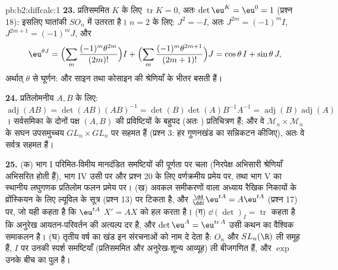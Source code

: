 \begin{solution}{pb:b2:diffcalc:1}
\textbf{23.} प्रतिसममित $K$ के लिए $\operatorname{tr}K = 0$, अतः $\det\eu^K = \eu^0 = 1$ (प्रश्न 18): इसलिए घातांकी
$SO_n$ में उतरता है। $n = 2$ के लिए: $J^2 = -I$, अतः $J^{2m} =
(-1)^mI$, $J^{2m+1} = (-1)^mJ$, और
\[
\eu^{\theta J}
= \Bigl(\sum_m\frac{(-1)^m\theta^{2m}}{(2m)!}\Bigr)I
+ \Bigl(\sum_m\frac{(-1)^m\theta^{2m+1}}{(2m+1)!}\Bigr)J
= \cos\theta\,I + \sin\theta\,J ,
\]
अर्थात् $\theta$ से घूर्णन: और साइन तथा कोसाइन की श्रेणियाँ  के
भीतर बसती हैं।

\textbf{24.} प्रतिलोमनीय $A, B$ के लिए: $\operatorname{adj}(AB) =
\det(AB)(AB)^{-1} = \det(B)\det(A)B^{-1}A^{-1} =
\operatorname{adj}(B)\operatorname{adj}(A)$। सर्वसमिका के दोनों पक्ष $(A, B)$ की
प्रविष्टियों के बहुपद (अतः ) प्रतिचित्रण हैं; और वे $\mathcal M_n\times\mathcal M_n$ के सघन
उपसमुच्चय $GL_n\times GL_n$ पर सहमत हैं (प्रश्न 3: हर गुणनखंड का सन्निकटन कीजिए), अतः
वे सर्वत्र सहमत हैं।

\textbf{25.} (क) भाग I परिमित-विमीय मानदंडित समष्टियों की पूर्णता पर चला
(निरपेक्ष अभिसारी श्रेणियाँ अभिसरित होती हैं), भाग IV उसी पर और प्रश्न 20
के लिए वर्णक्रमीय प्रमेय पर, तथा भाग V का स्थानीय लघुगणक प्रतिलोम फलन
प्रमेय पर। (ख) अवकल समीकरणों वाला अध्याय रैखिक निकायों के व्रोंस्कियन के
लिए ल्यूविल के सूत्र (प्रश्न 13) पर टिकता है, और $\frac{\dd}{\dd t}\eu^{tA} = A\eu^{tA}$ (प्रश्न 17) पर, जो
यही कहता है कि $\eu^{tA}$ $X' = AX$ को हल करता है। (ग) $\dd(\det)_I = \operatorname{tr}$ कहता है कि अनुरेख आयतन-परिवर्तन
की अत्यल्प दर है, और $\det\eu^A =
\eu^{\operatorname{tr}A}$ उसी कथन का वैश्विक समाकलन है। (घ) तृतीय वर्ष का
खंड इन संरचनाओं को नाम दे देता है: $O_n$ और $SL_n(\R)$ ली समूह हैं, $I$ पर उनकी
स्पर्श समष्टियाँ (प्रतिसममित और अनुरेख-शून्य आव्यूह) ली बीजगणित हैं, और
$\exp$ उनके बीच का पुल है।
\end{solution}
